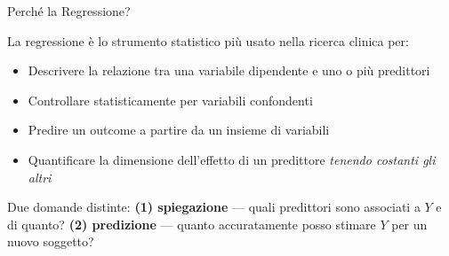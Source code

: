 \documentclass[
  ignorenonframetext,
]{beamer}
\begin{document}
\begin{frame}{Perché la Regressione?}
\label{perchuxe9-la-regressione}
\small

La regressione è lo strumento statistico più usato nella ricerca clinica
per:

\begin{itemize}\footnotesize
\item Descrivere la relazione tra una variabile dipendente e uno o più predittori
\item Controllare statisticamente per variabili confondenti
\item Predire un outcome a partire da un insieme di variabili
\item Quantificare la dimensione dell'effetto di un predittore \emph{tenendo costanti gli altri}
\end{itemize}

\vspace{0.4em}

\begin{center}
\end{center}

\vspace{0.3em}

\small Due domande distinte: \textbf{(1) spiegazione} --- quali
predittori sono associati a \(Y\) e di quanto? \textbf{(2) predizione}
--- quanto accuratamente posso stimare \(Y\) per un nuovo soggetto?
\end{frame}
\end{document}
